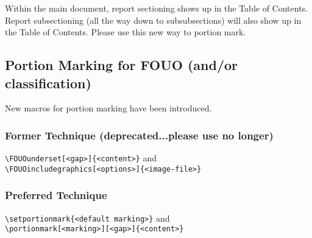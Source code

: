 \documentclass{arlticle}
\begin{document}
Within the main document, report sectioning shows up in the Table of Contents.
Report subsectioning (all the way down to subsubsections) will also show
  up in the Table of Contents.
Please use this new way to portion mark.

\subsection{Portion Marking for FOUO (and/or classification)}

New macros for portion marking have been introduced.

\subsubsection{Former Technique (deprecated...please use no longer)}
\verb|\FOUOunderset[<gap>]{<content>}| and \\
\verb|\FOUOincludegraphics[<options>]{<image-file>}|
\begin{ARLtable}[ht]
\caption{(FOUO) Table title includes FOUO portion marking}
%
\qquad{}
\end{ARLtable}

\subsubsection{Preferred Technique}
\verb|\setportionmark{<default marking>}| and \\
\verb|\portionmark[<marking>][<gap>]{<content>}|

\begin{ARLtable}[ht]
\caption{(FOUO) Table title includes FOUO portion marking}
%
\qquad{}
\end{ARLtable}
\end{document}
